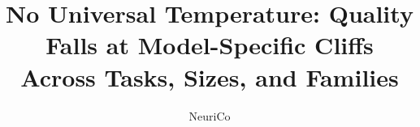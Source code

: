 \documentclass{article}
\title{No Universal Temperature: Quality Falls at Model-Specific Cliffs Across Tasks, Sizes, and Families}
\author{NeuriCo}
\begin{document}
\maketitle

\begin{abstract}

\end{abstract}









\end{document}
